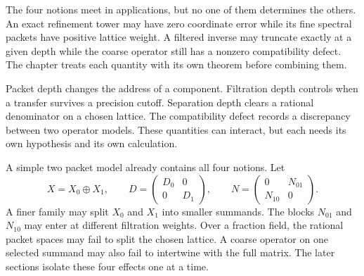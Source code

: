 The four notions meet in applications, but no one of them determines the others.  An exact refinement tower may have zero coordinate error while its fine spectral packets have positive lattice weight.  A filtered inverse may truncate exactly at a given depth while the coarse operator still has a nonzero compatibility defect.  The chapter treats each quantity with its own theorem before combining them.

\begin{keyidea}
Packet depth changes the address of a component. Filtration depth controls when a transfer survives a precision cutoff. Separation depth clears a rational denominator on a chosen lattice. The compatibility defect records a discrepancy between two operator models. These quantities can interact, but each needs its own hypothesis and its own calculation.
\end{keyidea}

A simple two packet model already contains all four notions.  Let
\[
X=X_0\oplus X_1,
\qquad
D=\begin{pmatrix}D_0&0\\0&D_1\end{pmatrix},
\qquad
N=\begin{pmatrix}0&N_{01}\\N_{10}&0\end{pmatrix}.
\]
A finer family may split $X_0$ and $X_1$ into smaller summands.  The blocks $N_{01}$ and $N_{10}$ may enter at different filtration weights.  Over a fraction field, the rational packet spaces may fail to split the chosen lattice.  A coarse operator on one selected summand may also fail to intertwine with the full matrix.  The later sections isolate these four effects one at a time.

